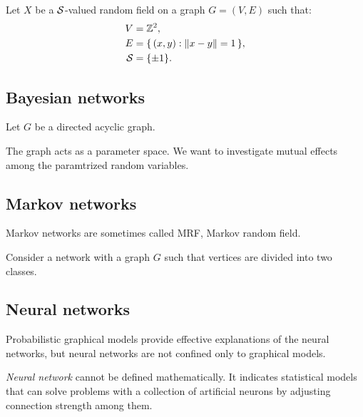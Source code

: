 \documentclass{../exp}
\begin{document}
\begin{ex}
Let $X$ be a $\mathcal{S}$-valued random field on a graph $G=(V,E)$ such that:
\begin{align*}
V&=\mathbb{Z}^2,\\
E&=\{\,(x,y):\|x-y\|=1\,\},\\
\mathcal{S}&=\{\pm1\}.
\end{align*}

\end{ex}

\subsection{Bayesian networks}


\begin{defn}
Let $G$ be a directed acyclic graph.
\end{defn}
The graph acts as a parameter space.
We want to investigate mutual effects among the paramtrized random variables.
\begin{thm}

\end{thm}

\begin{ex}
\end{ex}
\begin{ex}
\end{ex}


\subsection{Markov networks}

\begin{defn}
\end{defn}
Markov networks are sometimes called MRF, Markov random field.

\begin{ex}
Consider a network with a graph $G$ such that vertices are divided into two classes.
\end{ex}

\subsection{Neural networks}
Probabilistic graphical models provide effective explanations of the neural networks, but neural networks are not confined only to graphical models.
\begin{defn}
\emph{Neural network} cannot be defined mathematically.
It indicates statistical models that can solve problems with a collection of artificial neurons by adjusting connection strength among them.
\end{defn}
\end{document}
